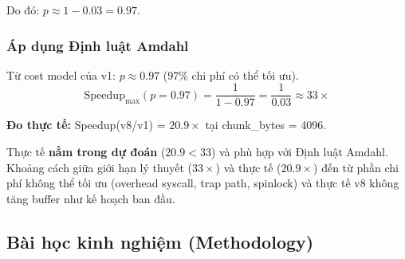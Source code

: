 \documentclass[12pt,a4paper]{article}
\begin{document}
Do đó: $p \approx 1 - 0.03 = 0.97$.

\subsubsection{Áp dụng Định luật Amdahl}

Từ cost model của v1: $p \approx 0.97$ (97\% chi phí có thể tối ưu).
\begin{equation}
\text{Speedup}_{\max}(p=0.97) = \frac{1}{1-0.97} = \frac{1}{0.03} \approx 33\times
\end{equation}

\textbf{Đo thực tế:} Speedup(v8/v1) = $20.9\times$ tại chunk\_bytes = 4096.

Thực tế \textbf{nằm trong dự đoán} ($20.9 < 33$) và phù hợp với Định luật Amdahl.
Khoảng cách giữa giới hạn lý thuyết ($33\times$) và thực tế ($20.9\times$) đến từ
phần chi phí không thể tối ưu (overhead syscall, trap path, spinlock) và thực tế
v8 không tăng buffer như kế hoạch ban đầu.


\subsection{Bài học kinh nghiệm (Methodology)}
\end{document}
